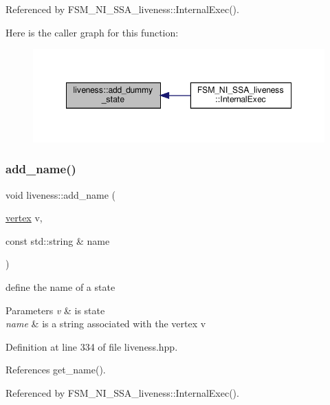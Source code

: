 Referenced by F\+S\+M\+\_\+\+N\+I\+\_\+\+S\+S\+A\+\_\+liveness\+::\+Internal\+Exec().

Here is the caller graph for this function\+:
\nopagebreak
\begin{figure}[H]
\begin{center}
\leavevmode
\includegraphics[width=348pt]{d3/d1f/classliveness_a8703aab0a7ace68883d5e7118f0dd2f1_icgraph}
\end{center}
\end{figure}
\mbox{\label{classliveness_a67923b3a3e7ebdf4c92b87977e7be7cd}} 
\subsubsection{\texorpdfstring{add\+\_\+name()}{add\_name()}}
{\footnotesize\ttfamily void liveness\+::add\+\_\+name (\begin{DoxyParamCaption}\item[{\hyperlink{graph_8hpp_abefdcf0544e601805af44eca032cca14}{vertex}}]{v,  }\item[{const std\+::string \&}]{name }\end{DoxyParamCaption})\hspace{0.3cm}{\ttfamily [inline]}}



define the name of a state 


\begin{DoxyParams}{Parameters}
{\em v} & is state \\
\hline
{\em name} & is a string associated with the vertex v \\
\hline
\end{DoxyParams}


Definition at line 334 of file liveness.\+hpp.



References get\+\_\+name().



Referenced by F\+S\+M\+\_\+\+N\+I\+\_\+\+S\+S\+A\+\_\+liveness\+::\+Internal\+Exec().

